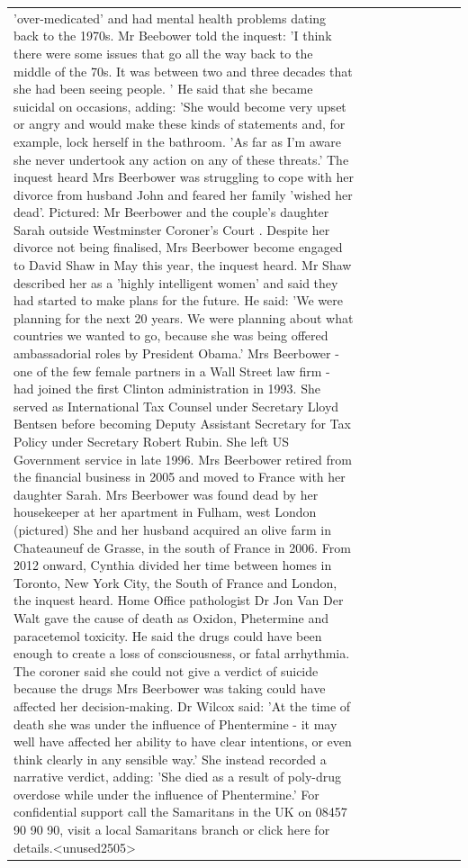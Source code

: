\begin{table}[H]
\begin{tabular}{lllrlllll}
'over-medicated' and had mental health problems dating back to the 1970s. Mr Beebower told the inquest: 'I think there were some issues that go all the way back to the middle of the 70s. It was between two and three decades that she had been seeing people. ' He said that she became suicidal on occasions, adding: 'She would become very upset or angry and would make these kinds of statements and, for example, lock herself in the bathroom. 'As far as I'm aware she never undertook any action on any of these threats.' The inquest heard Mrs Beerbower was struggling to cope with her divorce from husband John and feared her family 'wished her dead'. Pictured: Mr Beerbower and the couple's daughter Sarah outside Westminster Coroner's Court . Despite her divorce not being finalised, Mrs Beerbower become engaged to David Shaw in May this year, the inquest heard. Mr Shaw described her as a 'highly intelligent women' and said they had started to make plans for the future. He said: 'We were planning for the next 20 years. We were planning about what countries we wanted to go, because she was being offered ambassadorial roles by President Obama.' Mrs Beerbower - one of the few female partners in a Wall Street law firm - had joined the first Clinton administration in 1993. She served as International Tax Counsel under Secretary Lloyd Bentsen before becoming Deputy Assistant Secretary for Tax Policy under Secretary Robert Rubin. She left US Government service in late 1996. Mrs Beerbower retired from the financial business in 2005 and moved to France with her daughter Sarah. Mrs Beerbower was found dead by her housekeeper at her apartment in Fulham, west London (pictured) She and her husband acquired an olive farm in Chateauneuf de Grasse, in the south of France in 2006. From 2012 onward, Cynthia divided her time between homes in Toronto, New York City, the South of France and London, the inquest heard. Home Office pathologist Dr Jon Van Der Walt gave the cause of death as Oxidon, Phetermine and paracetemol toxicity. He said the drugs could have been enough to create a loss of consciousness, or fatal arrhythmia. The coroner said she could not give a verdict of suicide because the drugs Mrs Beerbower was taking could have affected her decision-making. Dr Wilcox said: 'At the time of death she was under the influence of Phentermine - it may well have affected her ability to have clear intentions, or even think clearly in any sensible way.' She instead recorded a narrative verdict, adding: 'She died as a result of poly-drug overdose while under the influence of Phentermine.' For confidential support call the Samaritans in the UK on 08457 90 90 90, visit a local Samaritans branch or click here for details.<unused2505> \\

\end{tabular}
\end{table}
